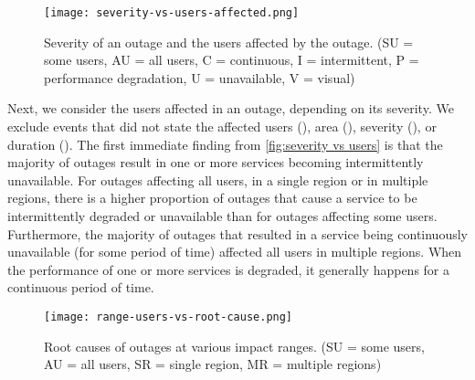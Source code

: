 \begin{figure}[h]
  \centering
  \texttt{[image: severity-vs-users-affected.png]}
  \caption{Severity of an outage and the users affected by the outage. (SU = some users, AU = all users, C = continuous, I = intermittent, P = performance degradation, U = unavailable, V = visual)}
  \label{fig:severity vs users}
\end{figure}

Next, we consider the users affected in an outage, depending on its severity.
We exclude events that did not state the affected users (), area (), severity (), or duration ().
The first immediate finding from \autoref{fig:severity vs users} is that the majority of outages result in one or more services becoming intermittently unavailable.
For outages affecting all users, in a single region or in multiple regions, there is a higher proportion of outages that cause a service to be intermittently degraded or unavailable than for outages affecting some users.
Furthermore, the majority of outages that resulted in a service being continuously unavailable (for some period of time) affected all users in multiple regions.
When the performance of one or more services is degraded, it generally happens for a continuous period of time.

\begin{figure}[h]
  \centering
  \texttt{[image: range-users-vs-root-cause.png]}
  \caption{Root causes of outages at various impact ranges. (SU = some users, AU = all users, SR = single region, MR = multiple regions)}
  \label{fig:causes vs impact ranges}
\end{figure}

